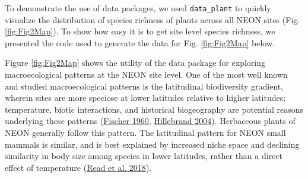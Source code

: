 \documentclass[
  12pt,
]{article}
\newenvironment{Shaded}{\begin{snugshade}}{\end{snugshade}}
\newcommand{\AttributeTok}[1]{\textcolor[rgb]{0.77,0.63,0.00}{#1}}
\newcommand{\CommentTok}[1]{\textcolor[rgb]{0.56,0.35,0.01}{\textit{#1}}}
\newcommand{\FunctionTok}[1]{\textcolor[rgb]{0.00,0.00,0.00}{#1}}
\newcommand{\NormalTok}[1]{#1}
\newcommand{\OtherTok}[1]{\textcolor[rgb]{0.56,0.35,0.01}{#1}}
\newcommand{\SpecialCharTok}[1]{\textcolor[rgb]{0.00,0.00,0.00}{#1}}
\newcommand{\StringTok}[1]{\textcolor[rgb]{0.31,0.60,0.02}{#1}}
\begin{document}
To demonstrate the use of data packages, we used \texttt{data\_plant} to quickly visualize the distribution of species richness of plants across all NEON sites (Fig. \ref{fig:Fig2Map}). To show how easy it is to get site level species richness, we presented the code used to generate the data for Fig. \ref{fig:Fig2Map} below.

\begin{Shaded}
\end{Shaded}

Figure \ref{fig:Fig2Map} shows the utility of the data package for exploring macroecological patterns at the NEON site level. One of the most well known and studied macroecological patterns is the latitudinal biodiversity gradient, wherein sites are more speciose at lower latitudes relative to higher latitudes; temperature, biotic interactions, and historical biogeography are potential reasons underlying these patterns (\protect\hyperlink{ref-fischer1960latitudinal}{Fischer 1960}, \protect\hyperlink{ref-hillebrand2004generality}{Hillebrand 2004}). Herbaceous plants of NEON generally follow this pattern. The latitudinal pattern for NEON small mammals is similar, and is best explained by increased niche space and declining similarity in body size among species in lower latitudes, rather than a direct effect of temperature (\protect\hyperlink{ref-read2018among}{Read et al. 2018}).
\end{document}
